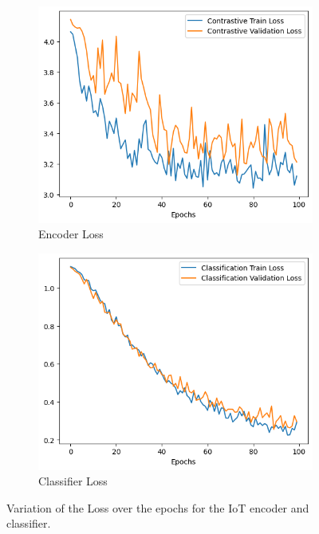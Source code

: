 \begin{figure}[H]
    \centering
    \begin{subfigure}{0.45\textwidth}
        \includegraphics[width=\linewidth]{Images/ConLoss_IoT.png}
        \caption{Encoder Loss}
        \label{fig:ConLossIoT}
    \end{subfigure}
    \hfill
    \begin{subfigure}{0.45\textwidth}
        \includegraphics[width=\linewidth]{Images/ClassLoss_IoT.png}
        \caption{Classifier Loss}
        \label{fig:ClassLossIoT}
    \end{subfigure}
    \caption{Variation of the Loss over the epochs for the IoT encoder and classifier.}
    \label{fig:LossIoT}
\end{figure}

